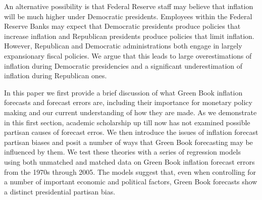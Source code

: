 \documentclass[a4paper]{article}\usepackage{graphicx, color}
\begin{document}
An alternative possibility is that Federal Reserve staff may believe that inflation will be much higher under Democratic presidents. Employees within the Federal Reserve Banks may expect that Democratic presidents produce policies that increase inflation and Republican presidents produce policies that limit inflation. However, Republican and Democratic administrations both engage in largely expansionary fiscal policies. We argue that this leads to large overestimations of inflation during Democratic presidencies and a significant underestimation of inflation during Republican ones.



In this paper we first provide a brief discussion of what Green Book inflation forecasts and forecast errors are, including their importance for monetary policy making and our current understanding of how they are made. As we demonstrate in this first section, academic scholarship up till now has not examined possible partisan causes of forecast erros. We then introduce the issues of inflation forecast partisan biases and posit a number of ways that Green Book forecasting may be influenced by them. We test these theories with a series of regression models using both unmatched and matched data on Green Book inflation forecast errors from the 1970s through 2005. The models suggest that, even when controlling for a number of important economic and political factors, Green Book forecasts show a distinct presidential partisan bias. 
\end{document}
